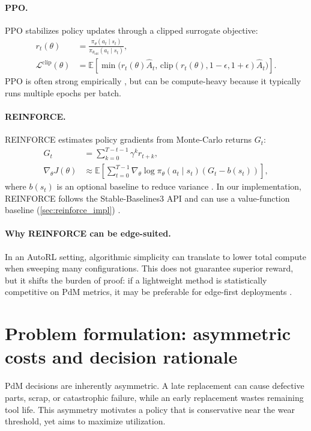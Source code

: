 \documentclass[11pt]{article}
\begin{document}
\paragraph{PPO.}
PPO stabilizes policy updates through a clipped surrogate objective:
\begin{align}
	r_t(\theta) &= \frac{\pi_\theta(a_t\mid s_t)}{\pi_{\theta_{\text{old}}}(a_t\mid s_t)},\\
	\mathcal{L}^{\text{clip}}(\theta) &= \mathbb{E}\left[\min\big(r_t(\theta)\hat{A}_t,\,\mathrm{clip}(r_t(\theta),1-\epsilon,1+\epsilon)\hat{A}_t\big)\right].
\end{align}
PPO is often strong empirically \parencite{Schulman2017PPO}, but can be compute-heavy because it typically runs multiple epochs per batch.

\paragraph{REINFORCE.}
REINFORCE estimates policy gradients from Monte-Carlo returns $G_t$:
\begin{align}
	G_t &= \sum_{k=0}^{T-t-1} \gamma^k r_{t+k},\\
	\nabla_\theta J(\theta) &\approx \mathbb{E}\left[\sum_{t=0}^{T-1} \nabla_\theta \log \pi_\theta(a_t\mid s_t)(G_t - b(s_t))\right],
\end{align}
where $b(s_t)$ is an optional baseline to reduce variance \parencite{Williams1992REINFORCE}. In our implementation, REINFORCE follows the Stable-Baselines3 API and can use a value-function baseline (\cref{sec:reinforce_impl}) \parencite{StableBaselines3}.

\paragraph{Why REINFORCE can be edge-suited.}
In an AutoRL setting, algorithmic simplicity can translate to lower total compute when sweeping many configurations. This does not guarantee superior reward, but it shifts the burden of proof: if a lightweight method is statistically competitive on PdM metrics, it may be preferable for edge-first deployments \parencite{Schwartz2020GreenAI, Njor2024TinyML}.

\section{Problem formulation: asymmetric costs and decision rationale}
\label{sec:problem}
PdM decisions are inherently asymmetric. A late replacement can cause defective parts, scrap, or catastrophic failure, while an early replacement wastes remaining tool life. This asymmetry motivates a policy that is conservative near the wear threshold, yet aims to maximize utilization.
\end{document}
